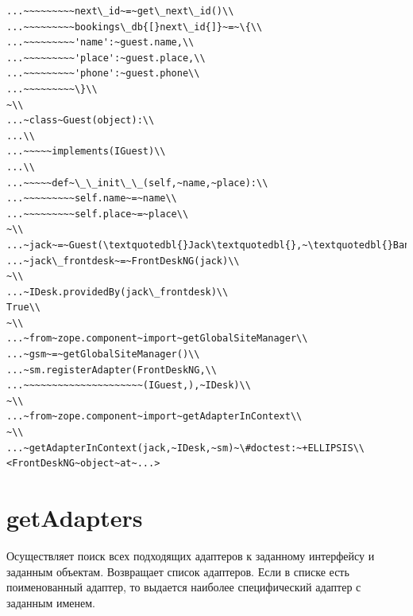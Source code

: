 \documentclass[a4paper,openany,twoside,draft]{book}
\begin{document}
\begin{verbatim}
...~~~~~~~~~next\_id~=~get\_next\_id()\\
...~~~~~~~~~bookings\_db{[}next\_id{]}~=~\{\\
...~~~~~~~~~'name':~guest.name,\\
...~~~~~~~~~'place':~guest.place,\\
...~~~~~~~~~'phone':~guest.phone\\
...~~~~~~~~~\}\\
~\\
...~class~Guest(object):\\
...\\
...~~~~~implements(IGuest)\\
...\\
...~~~~~def~\_\_init\_\_(self,~name,~place):\\
...~~~~~~~~~self.name~=~name\\
...~~~~~~~~~self.place~=~place\\
~\\
...~jack~=~Guest(\textquotedbl{}Jack\textquotedbl{},~\textquotedbl{}Bangalore\textquotedbl{})\\
...~jack\_frontdesk~=~FrontDeskNG(jack)\\
~\\
...~IDesk.providedBy(jack\_frontdesk)\\
True\\
~\\
...~from~zope.component~import~getGlobalSiteManager\\
...~gsm~=~getGlobalSiteManager()\\
...~sm.registerAdapter(FrontDeskNG,\\
...~~~~~~~~~~~~~~~~~~~~~(IGuest,),~IDesk)\\
~\\
...~from~zope.component~import~getAdapterInContext\\
~\\
...~getAdapterInContext(jack,~IDesk,~sm)~\#doctest:~+ELLIPSIS\\
<FrontDeskNG~object~at~...>
\end{verbatim}


\section*{getAdapters%
  \label{getadapters}%
}

Осуществляет поиск всех подходящих адаптеров к заданному интерфейсу и
заданным объектам.  Возвращает список адаптеров.  Если в списке есть
поименованный адаптер, то выдается наиболее специфический адаптер с
заданным именем.
\end{document}
